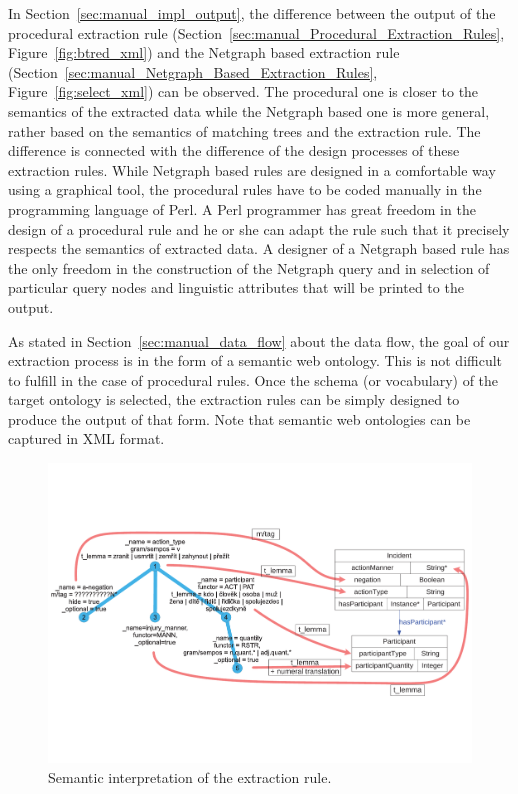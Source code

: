 In Section~\ref{sec:manual_impl_output}, the difference between the output of the procedural extraction rule (Section~\ref{sec:manual_Procedural_Extraction_Rules}, Figure~\ref{fig:btred_xml}) and the Netgraph based extraction rule (Section~\ref{sec:manual_Netgraph_Based_Extraction_Rules}, Figure~\ref{fig:select_xml}) can be observed. The procedural one is closer to the semantics of the extracted data while the Netgraph based one is more general, rather based on the semantics of matching trees and the extraction rule. The difference is connected with the difference of the design processes of these extraction rules. While Netgraph based rules are designed in a comfortable way using a graphical tool, the procedural rules have to be coded manually in the programming language of Perl. A Perl programmer has great freedom in the design of a procedural rule and he or she can adapt the rule such that it precisely respects the semantics of extracted data. A designer of a Netgraph based rule has the only freedom in the construction of the Netgraph query and in selection of particular query nodes and linguistic attributes that will be printed to the output.

As stated in Section~\ref{sec:manual_data_flow} about the data flow, the goal of our extraction process is in the form of a semantic web ontology. This is not difficult to fulfill in the case of procedural rules. Once the schema (or vocabulary) of the target ontology is selected, the extraction rules can be simply designed to produce the output of that form. Note that semantic web ontologies can be captured in XML format.


\begin{figure}[b!]
	\centering
		\includegraphics[angle=-90, width=\hsize]{semantic_interpretation}
	\caption{Semantic interpretation of the extraction rule.}
	\label{fig:manual_semantic_interpretation}
\end{figure}




